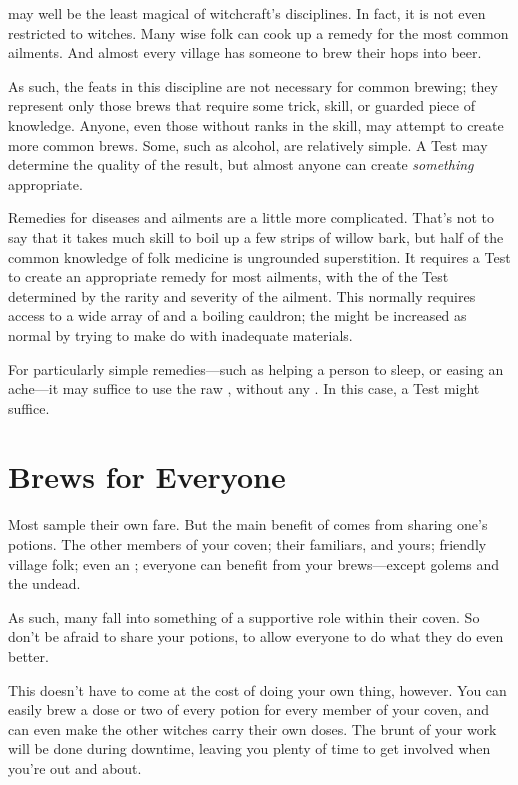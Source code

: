 
 may well be the least magical of witchcraft's disciplines.
In fact, it is not even restricted to witches.
Many wise folk can cook up a remedy for the most common ailments.
And almost every village has someone to brew their hops into beer.

As such, the feats in this discipline are not necessary for common brewing; they represent only those brews that require some trick, skill, or guarded piece of knowledge.
Anyone, even those without ranks in the  skill, may attempt to create more common brews.
Some, such as alcohol, are relatively simple.
A Test may determine the quality of the result, but almost anyone can create \emph{something} appropriate.

Remedies for diseases and ailments are a little more complicated.
That's not to say that it takes much skill to boil up a few strips of willow bark, but half of the common knowledge of folk medicine is ungrounded superstition.
It requires a  Test to create an appropriate remedy for most ailments, with the {\tn} of the Test determined by the rarity and severity of the ailment.
This normally requires access to a wide array of  and a boiling cauldron; the {\tn} might be increased as normal by trying to make do with inadequate materials.

For particularly simple remedies---such as helping a person to sleep, or easing an ache---it may suffice to use the raw , without any .
In this case, a  Test might suffice.

\section{Brews for Everyone}

Most  sample their own fare.
But the main benefit of  comes from sharing one's potions.
The other members of your coven; their familiars, and yours; friendly village folk; even an ; everyone can benefit from your brews---except golems and the undead.

As such, many  fall into something of a supportive role within their coven.
So don't be afraid to share your potions, to allow everyone to do what they do even better.

This doesn't have to come at the cost of doing your own thing, however.
You can easily brew a dose or two of every potion for every member of your coven, and can even make the other witches carry their own doses.
The brunt of your  work will be done during downtime, leaving you plenty of time to get involved when you're out and about.

